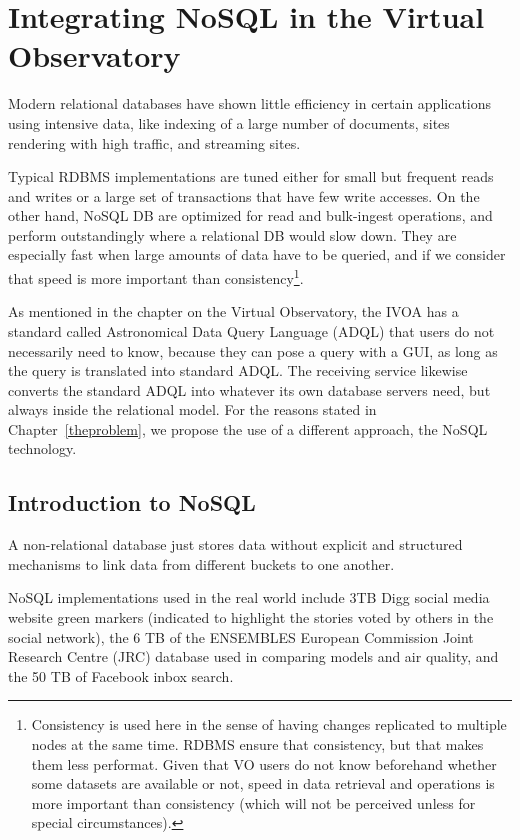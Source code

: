 \chapter{Integrating NoSQL in the Virtual Observatory}

Modern relational databases have shown little efficiency in certain applications using intensive data, like indexing of a large number of documents, sites rendering with high traffic, and streaming sites.

Typical RDBMS implementations are tuned either for small but frequent reads and writes or a large set of transactions that have few write accesses. On the other hand, NoSQL DB are optimized for read and bulk-ingest operations, and perform outstandingly where a relational DB would slow down. They are especially fast when large amounts of data have to be queried, and if we consider that speed is more important than consistency\footnote{Consistency is used here in the sense of having changes replicated to multiple nodes at the same time. RDBMS ensure that consistency, but that makes them less performat. Given that VO users do not know beforehand whether some datasets are available or not, speed in data retrieval and operations is more important than consistency (which will not be perceived unless for special circumstances).}.

As mentioned in the chapter on the Virtual Observatory, the
IVOA has a standard called Astronomical Data Query Language (ADQL) that users do not necessarily need to know, because
they %
can pose a query with a GUI, as long as the query is translated into standard ADQL. The receiving service likewise converts the standard ADQL into whatever its own database servers need, but always inside
the
relational model. For the reasons stated in Chapter~\ref{theproblem}, we propose the use of a different approach, the NoSQL technology.


\section{Introduction to NoSQL} %
\label{sec:nosql}

A non-relational database just stores data without explicit and structured mechanisms to link data from different buckets to one another.

NoSQL implementations used in the real world include 3TB Digg
social media website
green markers (indicated to highlight the stories voted by others in the social network), the 6 TB of
the ENSEMBLES
European Commission
Joint Research Centre (JRC)
database used in comparing models and air quality, and the 50 TB of Facebook inbox search. 

